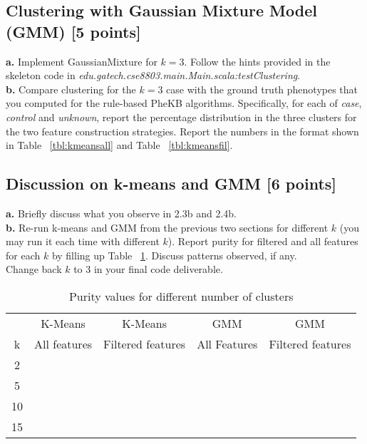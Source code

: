 \documentclass[12pt]{article}
\begin{document}
\subsection{Clustering with Gaussian Mixture Model (GMM) [5 points]}
\textbf{a.} Implement GaussianMixture for $k=3$. Follow the hints provided in the skeleton code in \textit{edu.gatech.cse8803.main.Main.scala:testClustering}.\\
\textbf{b.} Compare clustering for the $k=3$ case with the ground truth phenotypes that you computed for the rule-based PheKB algorithms. Specifically, for each of \textit{case}, \textit{control} and \textit{unknown}, report the percentage distribution in the three clusters for the two feature construction strategies. Report the numbers in the format shown in Table ~\ref{tbl:kmeansall} and Table ~\ref{tbl:kmeansfil}. \\

\subsection{Discussion on k-means and GMM [6 points]}
\textbf{a.} Briefly discuss what you observe in 2.3b and 2.4b.\\
\textbf{b.} Re-run k-means and GMM from the previous two sections for different $k$ (you may run it each time with different $k$). Report purity for filtered and all features for each $k$ by filling up Table ~\ref{tbl:kpurity}. Discuss patterns observed, if any.\\
Change back $k$ to 3 in your final code deliverable.

\begin{table}[h]
\centering
\begin{tabular}{ c | c | c | c | c}
  \hline
   & K-Means & K-Means & GMM & GMM\\
  k & All features & Filtered features & All Features & Filtered features \\
  \hline
  2 &   &  &  & \\
  5 &   &  &  & \\
  10 &   &  &  & \\
  15 &   &  &  & \\
  \hline  
\end{tabular}
\caption{Purity values for different number of clusters}
\label{tbl:kpurity}
\end{table}
\end{document}
